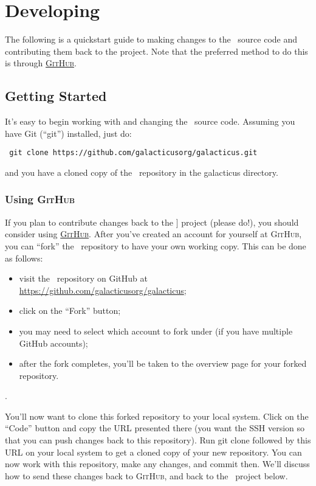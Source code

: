 \chapter{Developing \glc}

The following is a quickstart guide to making changes to the \glc\ source code and contributing them back to the project. Note that the preferred method to do this is through \href{https://github.com}{\normalfont \scshape GitHub}.

\section{Getting Started}

It's easy to begin working with and changing the \glc\ source code. Assuming you have Git (``{\normalfont \ttfamily git}'') installed, just do:
\begin{verbatim}
 git clone https://github.com/galacticusorg/galacticus.git
\end{verbatim}
and you have a cloned copy of the \glc\ repository in the {\normalfont \ttfamily galacticus} directory.

\subsection{Using {\normalfont \scshape GitHub}}

If you plan to contribute changes back to the \glc] project (please do!), you should consider using \href{https://github.com}{\normalfont \scshape GitHub}. After you've created an account for yourself at {\normalfont \scshape GitHub}, you can ``fork'' the \glc\ repository to have your own working copy. This can be done as follows:
\begin{itemize}
 \item visit the \glc\ repository on {\normalfont \ttfamily GitHub} at \href{https://github.com/galacticusorg/galacticus}{\normalfont \ttfamily https://github.com/galacticusorg/galacticus};
 \item click on the  ``Fork'' button;
 \item you may need to select which account to fork under (if you have multiple GitHub accounts);
 \item after the fork completes, you'll be taken to the overview page for your forked repository.
\end{itemize}. 

You'll now want to clone this forked repository to your local system. Click on the ``Code'' button and copy the URL presented there (you want the {\normalfont \ttfamily SSH} version so that you can push changes back to this repository). Run {\normalfont \ttfamily git clone} followed by this URL on your local system to get a cloned copy of your new repository. You can now work with this repository, make any changes, and commit then. We'll discuss how to send these changes back to {\normalfont \scshape GitHub}, and back to the \glc\ project below.

